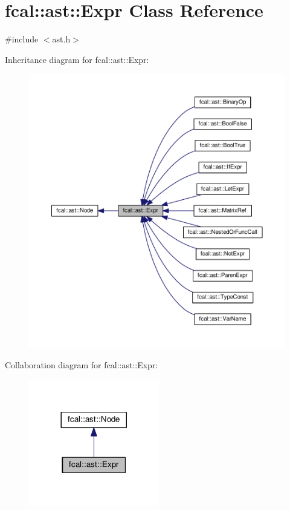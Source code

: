 \hypertarget{classfcal_1_1ast_1_1Expr}{}\section{fcal\+:\+:ast\+:\+:Expr Class Reference}
\label{classfcal_1_1ast_1_1Expr}


{\ttfamily \#include $<$ast.\+h$>$}



Inheritance diagram for fcal\+:\+:ast\+:\+:Expr\+:
\nopagebreak
\begin{figure}[H]
\begin{center}
\leavevmode
\includegraphics[width=350pt]{classfcal_1_1ast_1_1Expr__inherit__graph}
\end{center}
\end{figure}


Collaboration diagram for fcal\+:\+:ast\+:\+:Expr\+:
\nopagebreak
\begin{figure}[H]
\begin{center}
\leavevmode
\includegraphics[width=161pt]{classfcal_1_1ast_1_1Expr__coll__graph}
\end{center}
\end{figure}
